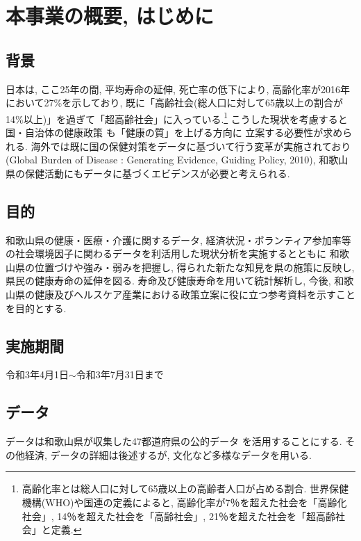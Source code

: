 
\chapter{本事業の概要, はじめに}
\section{背景}
日本は, ここ25年の間, 平均寿命の延伸, 死亡率の低下により, 高齢化率が2016年において27\%を示しており, 既に「高齢社会(総人口に対して65歳以上の割合が14\%以上)」を過ぎて「超高齢社会」に入っている.\footnote{
	高齢化率とは総人口に対して65歳以上の高齢者人口が占める割合. 世界保健機構(WHO)や国連の定義によると, 高齢化率が7％を超えた社会を「高齢化社会」, 14％を超えた社会を「高齢社会」, 21％を超えた社会を「超高齢社会」と定義.
}
こうした現状を考慮すると
国・自治体の健康政策
も「健康の質」を上げる方向に
立案する必要性が求められる.
海外では既に国の保健対策をデータに基づいて行う変革が実施されており(Global Burden of Disease :  Generating Evidence, Guiding Policy, 2010),
和歌山県の保健活動にもデータに基づくエビデンスが必要と考えられる.



\section{目的}
和歌山県の健康・医療・介護に関するデータ, 経済状況・ボランティア参加率等の社会環境因子に関わるデータを利活用した現状分析を実施するとともに
和歌山県の位置づけや強み・弱みを把握し,
得られた新たな知見を県の施策に反映し, 県民の健康寿命の延伸を図る.
寿命及び健康寿命を用いて統計解析し,
 今後, 和歌山県の健康及びヘルスケア産業における政策立案に役に立つ参考資料を示すことを目的とする.

\section{実施期間}
令和3年4月1日$\sim$令和3年7月31日まで


\section{データ}
データは和歌山県が収集した47都道府県の公的データ
を活用することにする.
その他経済, データの詳細は後述するが,
文化など多様なデータを用いる.


